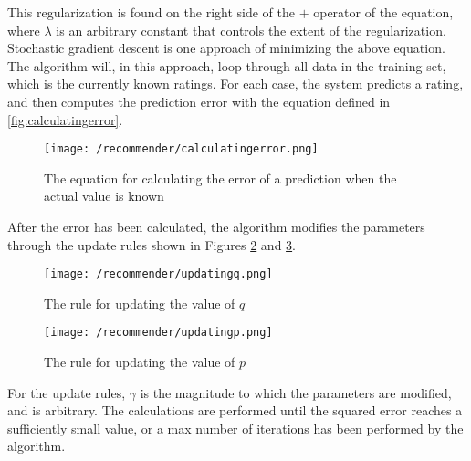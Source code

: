  This regularization is found on the right side of the $+$ operator of the equation, where $\lambda$ is an arbitrary constant that controls the extent of the regularization.
 Stochastic gradient descent is one approach of minimizing the above equation.
 The algorithm will, in this approach, loop through all data in the training set, which is the currently known ratings.
 For each case, the system predicts a rating, and then computes the prediction error with the equation defined in \autoref{fig:calculatingerror}.
 \begin{figure}[H]
    \centering
    \texttt{[image: /recommender/calculatingerror.png]}
     \caption{The equation for calculating the error of a prediction when the actual value is known}
     \label{fig:calculatingerror}
 \end{figure}
 \noindent
 After the error has been calculated, the algorithm modifies the parameters through the update rules shown in Figures \ref{fig:updatingq} and \ref{fig:updatingp}.
 \begin{figure}[H]
    \centering
    \texttt{[image: /recommender/updatingq.png]}
     \caption{The rule for updating the value of $q$}
     \label{fig:updatingq}
 \end{figure}
 \noindent
 
 \begin{figure}[H]
    \centering
    \texttt{[image: /recommender/updatingp.png]}
     \caption{The rule for updating the value of $p$}
     \label{fig:updatingp}
 \end{figure}
 \noindent
 For the update rules, $\gamma$ is the magnitude to which the parameters are modified, and is arbitrary.
 The calculations are performed until the squared error reaches a sufficiently small value, or a max number of iterations has been performed by the algorithm.
 